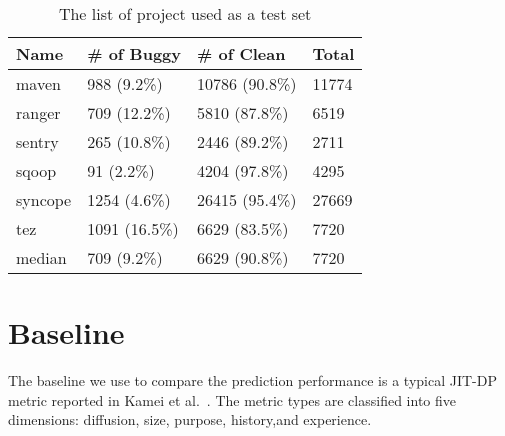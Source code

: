 \begin{table}[!htp]
\caption{The list of project used as a test set}
\centering
\begin{tabular}{|l|l|l|l|}
\hline
Name & \# of Buggy & \# of Clean & Total \\ \hline
maven & 988 (9.2\%) & 10786 (90.8\%) & 11774 \\ \hline
ranger & 709 (12.2\%) & 5810 (87.8\%) & 6519 \\ \hline
sentry & 265 (10.8\%) & 2446 (89.2\%) & 2711 \\ \hline
sqoop & 91 (2.2\%) & 4204 (97.8\%) & 4295 \\ \hline
syncope & 1254 (4.6\%) & 26415 (95.4\%) & 27669 \\ \hline
tez & 1091 (16.5\%) & 6629 (83.5\%) & 7720 \\ \hline
median & 709 (9.2\%) & 6629 (90.8\%) &  7720\\ \hline
\end{tabular}%
\newline
\label{tab:test_project}
\end{table}

\section{Baseline}
The baseline we use to compare the prediction performance is a typical JIT-DP metric reported in Kamei et al.~\cite{kamei2012large}.
The metric types are classified into five dimensions: diffusion, size, purpose, history,and experience. 

